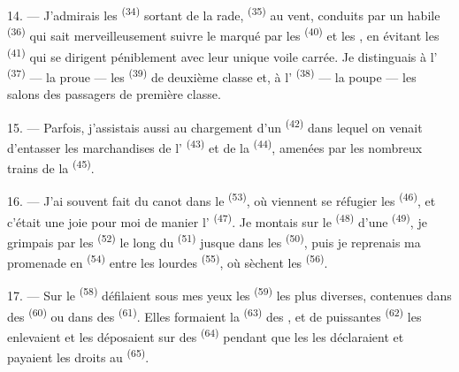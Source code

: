 14. --- J'admirais les  \textsuperscript{(34)} sortant
de la rade,  \textsuperscript{(35)} au vent, conduits par un
habile  \textsuperscript{(36)} qui sait merveilleusement suivre
le  marqué par les  \textsuperscript{(40)} et les
, en évitant les  \textsuperscript{(41)} qui se
dirigent péniblement avec leur unique voile carrée. Je distinguais à
l' \textsuperscript{(37)} --- la proue --- les 
\textsuperscript{(39)} de deuxième classe et, à l'
\textsuperscript{(38)} --- la poupe --- les salons des passagers de première
classe.

15. --- Parfois, j'assistais aussi au chargement d'un 
\textsuperscript{(42)} dans lequel on venait d'entasser les marchandises de
l' \textsuperscript{(43)} et de la 
\textsuperscript{(44)}, amenées par les nombreux trains de la  \textsuperscript{(45)}.

\VUsaut{3.0mm}
\VUsaut{3.0mm}

16. --- J'ai souvent fait du canot dans le 
\textsuperscript{(53)}, où viennent se réfugier les 
\textsuperscript{(46)}, et c'était une joie pour moi de manier l'
\textsuperscript{(47)}. Je montais sur le  \textsuperscript{(48)}
d'une  \textsuperscript{(49)}, je grimpais par les
 \textsuperscript{(52)} le long du 
\textsuperscript{(51)} jusque dans les  \textsuperscript{(50)},
puis je reprenais ma promenade en  \textsuperscript{(54)} entre les
lourdes  \textsuperscript{(55)}, où sèchent les
 \textsuperscript{(56)}.

17. --- Sur le  \textsuperscript{(58)} défilaient sous mes yeux les
 \textsuperscript{(59)} les plus diverses, contenues dans
des  \textsuperscript{(60)} ou dans des 
\textsuperscript{(61)}. Elles formaient la 
\textsuperscript{(63)} des , et de puissantes 
\textsuperscript{(62)} les enlevaient et les déposaient sur des
 \textsuperscript{(64)} pendant que les  les
déclaraient et payaient les droits au 
\textsuperscript{(65)}.

